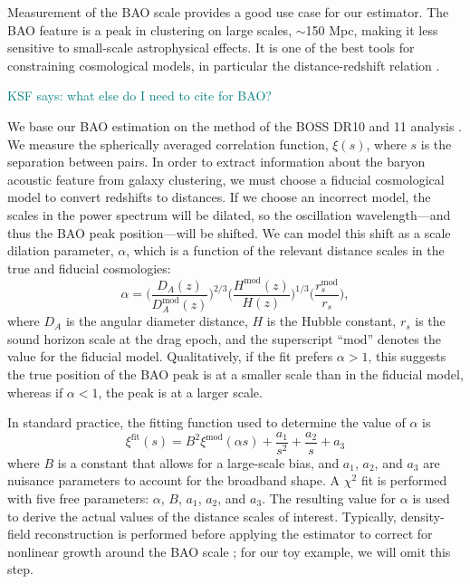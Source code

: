 \documentclass[modern]{aastex62}
\newcommand{\KSF}[1]{\textcolor{teal}{KSF says: #1}}
\begin{document}
Measurement of the BAO scale provides a good use case for our estimator.
The BAO feature is a peak in clustering on large scales, $\sim$150 Mpc, making it less sensitive to small-scale astrophysical effects.
It is one of the best tools for constraining cosmological models, in particular the distance-redshift relation \citep{Kazin2010, Anderson2012, Anderson2014, Alam2016}.

\KSF{what else do I need to cite for BAO?}

We base our BAO estimation on the method of the BOSS DR10 and 11 analysis \citep{Anderson2014}.
We measure the spherically averaged correlation function, $\xi(s)$, where $s$ is the separation between pairs.
In order to extract information about the baryon acoustic feature from galaxy clustering, we must choose a fiducial cosmological model to convert redshifts to distances.
If we choose an incorrect model, the scales in the power spectrum will be dilated, so the oscillation wavelength---and thus the BAO peak position---will be shifted.
We can model this shift as a scale dilation parameter, $\alpha$, which is a function of the relevant distance scales in the true and fiducial cosmologies:
\begin{equation} \label{eq:alpha}
\alpha = \Bigg( \frac{D_A(z)}{D_A^{\text{mod}}(z)} \Bigg)^{2/3} \Bigg( \frac{H^{\text{mod}}(z)}{H(z)} \Bigg)^{1/3} \Bigg( \frac{r_s^{\text{mod}}}{r_s} \Bigg),
\end{equation}
where $D_A$ is the angular diameter distance, $H$ is the Hubble constant, $r_s$ is the sound horizon scale at the drag epoch, and the superscript ``$\text{mod}$'' denotes the value for the fiducial model.
Qualitatively, if the fit prefers $\alpha>1$, this suggests the true position of the BAO peak is at a smaller scale than in the fiducial model, whereas if $\alpha<1$, the peak is at a larger scale.

In standard practice, the fitting function used to determine the value of $\alpha$ is
\begin{equation}
\xi^{\text{fit}}(s) = B^2 \xi^{\text{mod}}(\alpha s) + \frac{a_1}{s^2} + \frac{a_2}{s} + a_3
\end{equation}
where $B$ is a constant that allows for a large-scale bias, and $a_1$, $a_2$, and $a_3$ are nuisance parameters to account for the broadband shape.
A $\chi^2$ fit is performed with five free parameters: $\alpha$, $B$, $a_1$, $a_2$, and $a_3$.
The resulting value for $\alpha$ is used to derive the actual values of the distance scales of interest.
Typically, density-field reconstruction is performed before applying the estimator to correct for nonlinear growth around the BAO scale \citep{Eisenstein2007}; for our toy example, we will omit this step.
\end{document}
